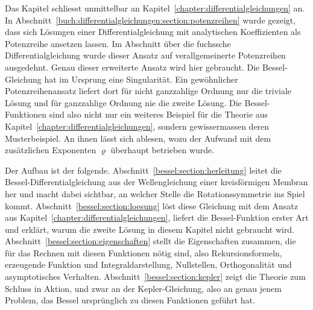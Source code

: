 Das Kapitel schliesst unmittelbar an Kapitel~\ref{chapter:differentialgleichungen} an.
In Abschnitt~\ref{buch:differentialgleichungen:section:potenzreihen} wurde gezeigt, dass sich Lösungen einer Differentialgleichung mit analytischen Koeffizienten als Potenzreihe ansetzen lassen.
Im Abschnitt über die fuchssche Differentialgleichung wurde dieser Ansatz auf verallgemeinerte Potenzreihen ausgedehnt.
Genau dieser erweiterte Ansatz wird hier gebraucht.
Die Bessel-Gleichung hat im Ursprung eine Singularität.
Ein gewöhnlicher Potenzreihenansatz liefert dort für nicht ganzzahlige Ordnung nur die triviale Lösung und für ganzzahlige Ordnung nie die zweite Lösung.
Die Bessel-Funktionen sind also nicht nur ein weiteres Beispiel für die Theorie aus Kapitel~\ref{chapter:differentialgleichungen}, sondern gewissermassen deren Musterbeispiel.
An ihnen lässt sich ablesen, wozu der Aufwand mit dem zusätzlichen Exponenten $\varrho$ überhaupt betrieben wurde.

Der Aufbau ist der folgende.
Abschnitt~\ref{bessel:section:herleitung} leitet die Bessel-Differentialgleichung aus der Wellengleichung einer kreisförmigen Membran her und macht dabei sichtbar, an welcher Stelle die Rotationssymmetrie ins Spiel kommt.
Abschnitt~\ref{bessel:section:loesung} löst diese Gleichung mit dem Ansatz aus Kapitel~\ref{chapter:differentialgleichungen}, liefert die Bessel-Funktion erster Art und erklärt, warum die zweite Lösung in diesem Kapitel nicht gebraucht wird.
Abschnitt~\ref{bessel:section:eigenschaften} stellt die Eigenschaften zusammen, die für das Rechnen mit diesen Funktionen nötig sind, also Rekursionsformeln, erzeugende Funktion und Integraldarstellung, Nullstellen, Orthogonalität und asymptotisches Verhalten.
Abschnitt~\ref{bessel:section:kepler} zeigt die Theorie zum Schluss in Aktion, und zwar an der Kepler-Gleichung, also an genau jenem Problem, das Bessel ursprünglich zu diesen Funktionen geführt hat.
